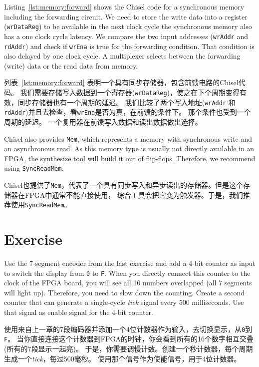 \documentclass[%
    10pt,
    headinclude, footexclude,
    openright, %
    notitlepage,
    cleardoubleempty,
    headsepline,
    pointlessnumbers,
    bibtotoc, idxtotoc,
    ]{scrbook}
\newcommand{\code}[1]{{\small{\texttt{#1}}}}
\begin{document}
Listing~\ref{lst:memory:forward} shows the Chisel code for a synchronous memory
including the forwarding circuit. We need to store the write data into a register
(\code{wrDataReg}) to be available in the next clock cycle the synchronous
memory also has a one clock cycle latency.
We compare the two input addresses (\code{wrAddr} and \code{rdAddr})
and check if \code{wrEna} is true for the forwarding condition.
That condition is also delayed by one clock cycle.
A multiplexer selects between the forwarding (write) data or the read
data from memory.

列表~\ref{lst:memory:forward} 表明一个具有同步存储器，包含前馈电路的Chisel代码。
我们需要存储写入数据到一个寄存器(\code{wrDataReg})，使之在下个周期变得有效，同步存储器也有一个周期的延迟。
我们比较了两个写入地址(\code{wrAddr} 和 \code{rdAddr})并且去检查，看\code{wrEna}是否为真，在前馈的条件下。
那个条件也受到一个周期的延迟。
一个复用器在前馈写入数据和读出数据做出选择。


Chisel also provides \code{Mem}, which represents a memory with synchronous
write and an asynchronous read. As this memory type is usually not directly available
in an FPGA, the synthesize tool will build it out of flip-flops.
Therefore, we recommend using \code{SyncReadMem}.

Chisel也提供了\code{Mem}，代表了一个具有同步写入和异步读出的存储器。但是这个存储器在FPGA中通常不能直接使用，
综合工具会把它变为触发器。于是，我们推荐使用\code{SyncReadMem}。

\section{Exercise}

Use the 7-segment encoder from the last exercise and add a 4-bit counter as input
to switch the display from \code{0} to \code{F}. When you directly connect this
counter to the clock of the FPGA board, you will see all 16 numbers
overlapped (all 7 segments will light up).
Therefore, you need to slow down the counting. Create a second
counter that can generate a single-cycle \emph{tick} signal every 500 milliseconds.
Use that signal as enable signal for the 4-bit counter.

使用来自上一章的7段编码器并添加一个4位计数器作为输入，去切换显示，从\code{0}到\code{F}。
当你直接连接这个计数器到FPGA的时钟，你会看到所有的16个数字相互交叠(所有的7段显示一起亮)。
于是，你需要调慢计数。创建一个秒计数器，每个周期生成一个\emph{tick}，每过500毫秒。
使用那个信号作为使能信号，用于4位计数器。
\end{document}
